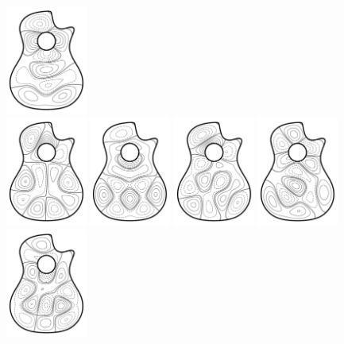 \documentclass[presentation,aspectratio=43, 10pt]{beamer}
\begin{document}
\begin{frame}
\begin{columns}
\begin{column}{0.4\textwidth}
      \includegraphics[width=0.2\textwidth]{../pictures/guitar/cutaway-eigfunc12.pdf}
      \\
      \includegraphics[width=0.2\textwidth]{../pictures/guitar/cutaway-eigfunc15.pdf}%
      \includegraphics[width=0.2\textwidth]{../pictures/guitar/cutaway-eigfunc16.pdf}%
      \includegraphics[width=0.2\textwidth]{../pictures/guitar/cutaway-eigfunc17.pdf}%
      \includegraphics[width=0.2\textwidth]{../pictures/guitar/cutaway-eigfunc18.pdf}%
      \includegraphics[width=0.2\textwidth]{../pictures/guitar/cutaway-eigfunc19.pdf}

\end{column}
\end{columns}
\end{frame}
\end{document}

